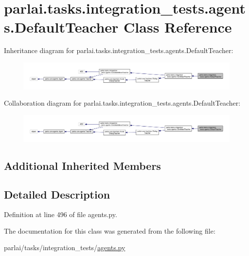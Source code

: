 \hypertarget{classparlai_1_1tasks_1_1integration__tests_1_1agents_1_1DefaultTeacher}{}\section{parlai.\+tasks.\+integration\+\_\+tests.\+agents.\+Default\+Teacher Class Reference}
\label{classparlai_1_1tasks_1_1integration__tests_1_1agents_1_1DefaultTeacher}


Inheritance diagram for parlai.\+tasks.\+integration\+\_\+tests.\+agents.\+Default\+Teacher\+:
\nopagebreak
\begin{figure}[H]
\begin{center}
\leavevmode
\includegraphics[width=350pt]{d9/daf/classparlai_1_1tasks_1_1integration__tests_1_1agents_1_1DefaultTeacher__inherit__graph}
\end{center}
\end{figure}


Collaboration diagram for parlai.\+tasks.\+integration\+\_\+tests.\+agents.\+Default\+Teacher\+:
\nopagebreak
\begin{figure}[H]
\begin{center}
\leavevmode
\includegraphics[width=350pt]{d9/de7/classparlai_1_1tasks_1_1integration__tests_1_1agents_1_1DefaultTeacher__coll__graph}
\end{center}
\end{figure}
\subsection*{Additional Inherited Members}


\subsection{Detailed Description}


Definition at line 496 of file agents.\+py.



The documentation for this class was generated from the following file\+:\begin{DoxyCompactItemize}
\item 
parlai/tasks/integration\+\_\+tests/\hyperlink{parlai_2tasks_2integration__tests_2agents_8py}{agents.\+py}\end{DoxyCompactItemize}
